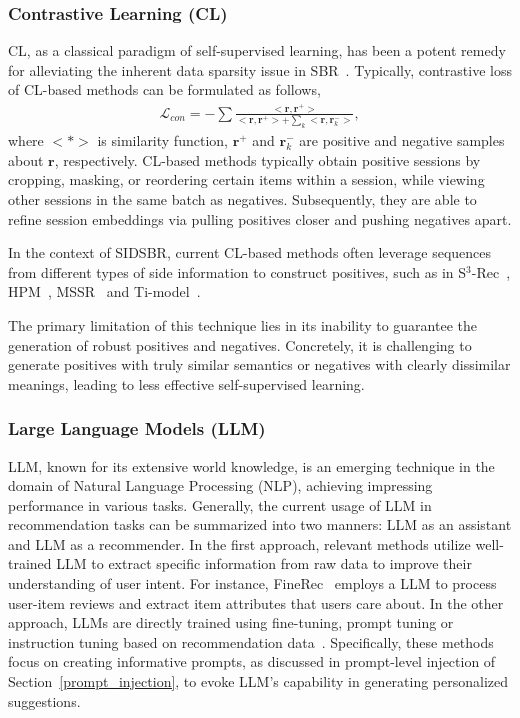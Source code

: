 \documentclass[lettersize,journal]{IEEEtran}
\newcommand{\baby}{{SIDSBR}\xspace}
\begin{document}
\subsubsection{Contrastive Learning (CL)}
CL, as a classical paradigm of self-supervised learning, has been a potent remedy for alleviating the inherent data sparsity issue in SBR~\cite{Xia@CIKM2021,Xie@ICDE2022}. Typically, contrastive loss of CL-based methods can be formulated as follows,
\begin{align}
        \mathcal{L}_{con} = -\sum \frac{<\mathbf{r}, \mathbf{r}^{+}>}{<\mathbf{r}, \mathbf{r}^{+}> + \sum_{k}<\mathbf{r},  \mathbf{r}_{k}^{-}>},
\end{align}
where $<*>$ is similarity function, $\mathbf{r}^{+}$ and $\mathbf{r}_{k}^{-}$ are positive and negative samples about $\mathbf{r}$, respectively. CL-based methods typically obtain positive sessions by cropping, masking, or reordering certain items within a session, while viewing other sessions in the same batch as negatives. Subsequently, they are able to refine session embeddings via pulling positives closer and pushing negatives apart. 

In the context of \baby, current CL-based methods often leverage sequences from different types of side information to construct positives, such as in S$^3$-Rec~\cite{Zhou@CIKM2020}, HPM~\cite{Huang@SIGIR2023}, MSSR~\cite{Lin@WSDM2024} and Ti-model~\cite{Dang@AAAI2023}. 

The primary limitation of this technique lies in its inability to guarantee the generation of robust positives and negatives. Concretely, it is challenging to generate positives with truly similar semantics or negatives with clearly dissimilar meanings, leading to less effective self-supervised learning. 


\subsubsection{Large Language Models (LLM)}\label{llm}
LLM, known for its extensive world knowledge, is an emerging technique in the domain of Natural Language Processing (NLP), achieving impressing performance in various tasks. Generally, the current usage of LLM in recommendation tasks can be summarized into two manners: LLM as an assistant and LLM as a recommender. In the first approach, relevant methods utilize well-trained LLM to extract specific information from raw data to improve their understanding of user intent. For instance, FineRec~\cite{FineRec} employs a LLM to process user-item reviews and extract item attributes that users care about. In the other approach, LLMs are directly trained using fine-tuning, prompt tuning or instruction tuning  based on recommendation data~\cite{Hu@WWW2024,Zheng@WWW2024,Sun@SIGIR2024}. Specifically, these methods focus on creating informative prompts, as discussed in prompt-level injection of Section~\ref{prompt_injection}, to evoke LLM's capability in generating personalized suggestions. 
\end{document}
